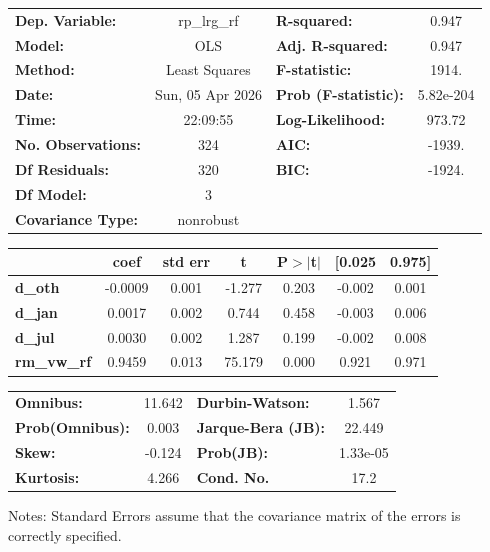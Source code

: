 \begin{center}
\begin{tabular}{lclc}
\toprule
\textbf{Dep. Variable:}    &   rp\_lrg\_rf    & \textbf{  R-squared:         } &     0.947   \\
\textbf{Model:}            &       OLS        & \textbf{  Adj. R-squared:    } &     0.947   \\
\textbf{Method:}           &  Least Squares   & \textbf{  F-statistic:       } &     1914.   \\
\textbf{Date:}             & Sun, 05 Apr 2026 & \textbf{  Prob (F-statistic):} & 5.82e-204   \\
\textbf{Time:}             &     22:09:55     & \textbf{  Log-Likelihood:    } &    973.72   \\
\textbf{No. Observations:} &         324      & \textbf{  AIC:               } &    -1939.   \\
\textbf{Df Residuals:}     &         320      & \textbf{  BIC:               } &    -1924.   \\
\textbf{Df Model:}         &           3      & \textbf{                     } &             \\
\textbf{Covariance Type:}  &    nonrobust     & \textbf{                     } &             \\
\bottomrule
\end{tabular}
\begin{tabular}{lcccccc}
                    & \textbf{coef} & \textbf{std err} & \textbf{t} & \textbf{P$> |$t$|$} & \textbf{[0.025} & \textbf{0.975]}  \\
\midrule
\textbf{d\_oth}     &      -0.0009  &        0.001     &    -1.277  &         0.203        &       -0.002    &        0.001     \\
\textbf{d\_jan}     &       0.0017  &        0.002     &     0.744  &         0.458        &       -0.003    &        0.006     \\
\textbf{d\_jul}     &       0.0030  &        0.002     &     1.287  &         0.199        &       -0.002    &        0.008     \\
\textbf{rm\_vw\_rf} &       0.9459  &        0.013     &    75.179  &         0.000        &        0.921    &        0.971     \\
\bottomrule
\end{tabular}
\begin{tabular}{lclc}
\textbf{Omnibus:}       & 11.642 & \textbf{  Durbin-Watson:     } &    1.567  \\
\textbf{Prob(Omnibus):} &  0.003 & \textbf{  Jarque-Bera (JB):  } &   22.449  \\
\textbf{Skew:}          & -0.124 & \textbf{  Prob(JB):          } & 1.33e-05  \\
\textbf{Kurtosis:}      &  4.266 & \textbf{  Cond. No.          } &     17.2  \\
\bottomrule
\end{tabular}
\end{center}

Notes: \newline
 [1] Standard Errors assume that the covariance matrix of the errors is correctly specified.
